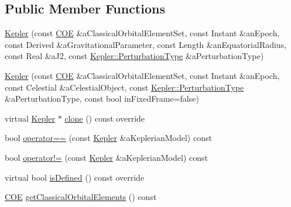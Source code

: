 \subsection*{Public Member Functions}
\begin{DoxyCompactItemize}
\item 
\hyperlink{classlibrary_1_1astro_1_1trajectory_1_1orbit_1_1models_1_1_kepler_ae0c322251dbb025bfbdefd9f7b97e018}{Kepler} (const \hyperlink{classlibrary_1_1astro_1_1trajectory_1_1orbit_1_1models_1_1kepler_1_1_c_o_e}{C\+OE} \&a\+Classical\+Orbital\+Element\+Set, const Instant \&an\+Epoch, const Derived \&a\+Gravitational\+Parameter, const Length \&an\+Equatorial\+Radius, const Real \&a\+J2, const \hyperlink{classlibrary_1_1astro_1_1trajectory_1_1orbit_1_1models_1_1_kepler_a7f34995d6f287de65a6edb2d419a2fe0}{Kepler\+::\+Perturbation\+Type} \&a\+Perturbation\+Type)
\item 
\hyperlink{classlibrary_1_1astro_1_1trajectory_1_1orbit_1_1models_1_1_kepler_a07fe8f18505ab866ba777fc37e8390a3}{Kepler} (const \hyperlink{classlibrary_1_1astro_1_1trajectory_1_1orbit_1_1models_1_1kepler_1_1_c_o_e}{C\+OE} \&a\+Classical\+Orbital\+Element\+Set, const Instant \&an\+Epoch, const Celestial \&a\+Celestial\+Object, const \hyperlink{classlibrary_1_1astro_1_1trajectory_1_1orbit_1_1models_1_1_kepler_a7f34995d6f287de65a6edb2d419a2fe0}{Kepler\+::\+Perturbation\+Type} \&a\+Perturbation\+Type, const bool in\+Fixed\+Frame=false)
\item 
virtual \hyperlink{classlibrary_1_1astro_1_1trajectory_1_1orbit_1_1models_1_1_kepler}{Kepler} $\ast$ \hyperlink{classlibrary_1_1astro_1_1trajectory_1_1orbit_1_1models_1_1_kepler_ac78a023cde4a61c62309051c9147d66e}{clone} () const override
\item 
bool \hyperlink{classlibrary_1_1astro_1_1trajectory_1_1orbit_1_1models_1_1_kepler_a1fbf0650ece0aa4fd99bc9d8d4bc1f77}{operator==} (const \hyperlink{classlibrary_1_1astro_1_1trajectory_1_1orbit_1_1models_1_1_kepler}{Kepler} \&a\+Keplerian\+Model) const
\item 
bool \hyperlink{classlibrary_1_1astro_1_1trajectory_1_1orbit_1_1models_1_1_kepler_a38a315b4ffbfe6293c2570ade157865c}{operator!=} (const \hyperlink{classlibrary_1_1astro_1_1trajectory_1_1orbit_1_1models_1_1_kepler}{Kepler} \&a\+Keplerian\+Model) const
\item 
virtual bool \hyperlink{classlibrary_1_1astro_1_1trajectory_1_1orbit_1_1models_1_1_kepler_a600d7752a50924ee6e3fc08f18a229e9}{is\+Defined} () const override
\item 
\hyperlink{classlibrary_1_1astro_1_1trajectory_1_1orbit_1_1models_1_1kepler_1_1_c_o_e}{C\+OE} \hyperlink{classlibrary_1_1astro_1_1trajectory_1_1orbit_1_1models_1_1_kepler_a224a8ad539b7739447a0e9bd98e6f66d}{get\+Classical\+Orbital\+Elements} () const

\end{DoxyCompactItemize}
